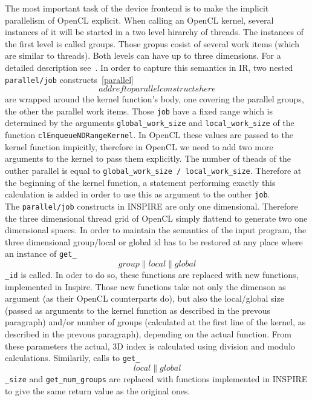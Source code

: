 The most important task of the device frontend is to make the implicit parallelism of OpenCL explicit. When calling an OpenCL kernel, several instances of it will be started in a two level hirarchy of threads. The instances of the first level is called groups. Those gropus cosist of several work items (which are similar to threads). Both levels can have up to three dimensions. For a detailed description see~\cite{oclRef}. In order to capture this semantics in IR, two nested \texttt{parallel/job} constructs~\ref{parallel}\[add ref to parallel constructs here\] are wrapped around the kernel function's body, one covering the parallel groups, the other the parallel work items. Those \texttt{job} have a fixed range which is determined by the arguments \texttt{global\_work\_size} and \texttt{local\_work\_size} of the function \texttt{clEnqueueNDRangeKernel}. In OpenCL these values are passed to the kernel function impicitly, therefore in OpenCL we need to add two more arguments to the kernel to pass them explicitly. The number of theads of the outher parallel is equal to \texttt{global\_work\_size / local\_work\_size}. Therefore at the beginning of the kernel function, a statement performing exactly this calculation is added in order to use this as argument to the outher \texttt{job}. \\

The \texttt{parallel/job} constructs in INSPIRE are only one dimensional. Therefore the three dimensional thread grid of OpenCL simply flattend to generate two one dimensional spaces. In order to maintain the semantics of the input program, the three dimensional group/local or global id has to be restored at any place where an instance of \texttt{get\_\[group\|local\|global\]\_id} is called. In oder to do so, these functions are replaced with new functions, implemented in Inspire. Those new functions take not only the dimenson as argument (as their OpenCL counterparts do), but also the local/global size (passed as arguments to the kernel function as described in the prevous paragraph) and/or number of groups (calculated at the first line of the kernel, as described in the prevous paragraph), depending on the actual function. From these parameters the actual, 3D index is calculated using division and modulo calculations. Similarily, calls to \texttt{get\_\[local\|global\]\_size} and \texttt{get\_num\_groups} are replaced with functions implemented in INSPIRE to give the same return value as the original ones. \\

